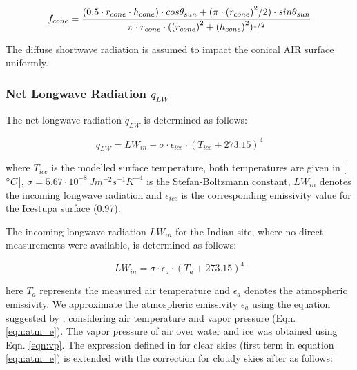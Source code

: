 \documentclass[utf8]{frontiersSCNS}
\begin{document}
\begin{equation}
	\begin{split}
		f_{cone}& =\frac{(0.5 \cdot r_{cone} \cdot h_{cone}) \cdot cos \theta_{sun} +(\pi \cdot
			{(r_{cone})}^2/2) \cdot sin \theta_{sun} }{\pi \cdot r_{cone} \cdot ({(r_{cone})}^2+{(h_{cone})}^2)^{1/2}}\\
	\end{split}
	\label{eqn:f_{cone}}
\end{equation}

The diffuse shortwave radiation is assumed to impact the conical AIR surface uniformly.

\subsubsection{Net Longwave Radiation \texorpdfstring{$q_{LW}$}{Lg}} \label{sec:LW}

The net longwave radiation $q_{LW}$ is determined as follows:

\begin{equation}
	q_{LW}= LW_{in}-\sigma \cdot \epsilon_{ice} \cdot {(T_{ice}+ 273.15)}^4
	\label{eqn:LW}
\end{equation}

where $T_{ice}$ is the modelled surface temperature, both temperatures are given in [$\degree C$],
$\sigma=5.67\cdot10^{-8}\,Jm^{-2}s^{-1}K^{-4}$ is the Stefan-Boltzmann constant, $LW_{in}$ denotes the incoming
longwave radiation and $\epsilon_{ice}$ is the corresponding emissivity value for the Icestupa surface (0.97).

The incoming longwave radiation $LW_{in}$ for the Indian site, where no direct measurements were available, is
determined as follows:

\begin{equation}
	LW_{in}=\sigma \cdot \epsilon_a \cdot {(T_a+ 273.15)}^4
	\label{eqn:LWin}
\end{equation}

here $T_a$ represents the measured air temperature and $\epsilon_a$ denotes the atmospheric emissivity. We
approximate the atmospheric emissivity $\epsilon_a$ using the equation suggested by \cite{Brutsaert_1982},
considering air temperature and vapor pressure (Eqn.  \ref{eqn:atm_e}). The vapor pressure of air over water and
ice was obtained using Eqn. \ref{eqn:vp}.  The expression defined in \cite{Brutsaert_1975} for clear skies
(first term in equation \ref{eqn:atm_e}) is extended with the correction for cloudy skies after
\cite{Brutsaert_1982} as follows:
\end{document}

